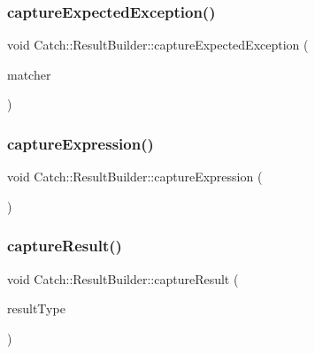 \hypertarget{class_catch_1_1_result_builder_a7d443d632eaeabe2cb36218b8dcb7400}{}\label{class_catch_1_1_result_builder_a7d443d632eaeabe2cb36218b8dcb7400} 
\subsubsection{\texorpdfstring{capture\+Expected\+Exception()}{captureExpectedException()}\hspace{0.1cm}{\footnotesize\ttfamily [2/2]}}
{\footnotesize\ttfamily void Catch\+::\+Result\+Builder\+::capture\+Expected\+Exception (\begin{DoxyParamCaption}\item[{\hyperlink{struct_catch_1_1_matchers_1_1_impl_1_1_matcher}{Matchers\+::\+Impl\+::\+Matcher}$<$ std\+::string $>$ const \&}]{matcher }\end{DoxyParamCaption})}

\hypertarget{class_catch_1_1_result_builder_af2ae2343965802eeeb0abbd4ea9d2d36}{}\label{class_catch_1_1_result_builder_af2ae2343965802eeeb0abbd4ea9d2d36} 
\subsubsection{\texorpdfstring{capture\+Expression()}{captureExpression()}}
{\footnotesize\ttfamily void Catch\+::\+Result\+Builder\+::capture\+Expression (\begin{DoxyParamCaption}{ }\end{DoxyParamCaption})}

\hypertarget{class_catch_1_1_result_builder_a10e467f7b7a4976e5d148b4d5066e8fd}{}\label{class_catch_1_1_result_builder_a10e467f7b7a4976e5d148b4d5066e8fd} 
\subsubsection{\texorpdfstring{capture\+Result()}{captureResult()}}
{\footnotesize\ttfamily void Catch\+::\+Result\+Builder\+::capture\+Result (\begin{DoxyParamCaption}\item[{\hyperlink{struct_catch_1_1_result_was_a624e1ee3661fcf6094ceef1f654601ef}{Result\+Was\+::\+Of\+Type}}]{result\+Type }\end{DoxyParamCaption})}

